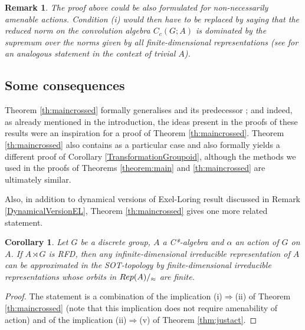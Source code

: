 \documentclass[11 pt, leqno, hidelinks]{amsart}%
\theoremstyle{plain}
\newtheorem{corollary}[theorem]{Corollary}
\newtheorem{remark}[theorem]{Remark}
\numberwithin{equation}{section}
\newcommand{\Rep}{\textup{Rep}}
\newcommand{\Prim}{\textup{Prim}}
\begin{document}
\begin{remark}\label{rem:nonamen}
	The proof above could be also formulated for non-necessarily amenable actions. Condition (i) would then have to be replaced by saying that the reduced norm on the convolution algebra $C_c(G;A)$ is dominated by the supremum over the norms given by all finite-dimensional representations (see \cite[Proposition 1]{BekkaForum} for an analogous statement in the context of trivial $A$).
\end{remark}
	

\subsection{Some consequences}

Theorem \ref{th:maincrossed} formally generalises \cite[Theorem 4.3]{BekkaLouvet} and its predecessor \cite[Proposition 1]{BekkaForum}; and indeed, as already mentioned in the introduction, the ideas present in the proofs of these results were an inspiration for a proof of Theorem \ref{th:maincrossed}. Theorem \ref{th:maincrossed} also contains \cite[Cor. 4.1.11]{TomiyamaBook} as a particular case and also formally yields a different proof of Corollary  \ref{TransformationGroupoid}, although the methods we used in the proofs of Theorems \ref{theorem:main}  and  \ref{th:maincrossed} are ultimately similar.

Also, in addition to dynamical versions of Exel-Loring result discussed in Remark \ref{DynamicalVersionEL},  Theorem \ref{th:maincrossed}  gives one more related statement.





\begin{corollary}
	Let $G$ be a discrete  group, $A$ a C*-algebra and $\alpha$ an  action of $G$ on $A$. If 	 $A\rtimes G$ is RFD, then
	any infinite-dimensional irreducible representation of $A$ can be approximated in the SOT-topology by finite-dimensional irreducible  representations whose orbits in $\Rep(A)/_\approx$ are finite.
\end{corollary}
\begin{proof}
	The statement is a combination of the implication (i)$\Longrightarrow$(ii) of Theorem \ref{th:maincrossed} (note that this implication does not require amenability of action) and of the implication  (ii)$\Longrightarrow$(v) of Theorem \ref{thm:justact}.
%	
\end{proof}
\end{document}
